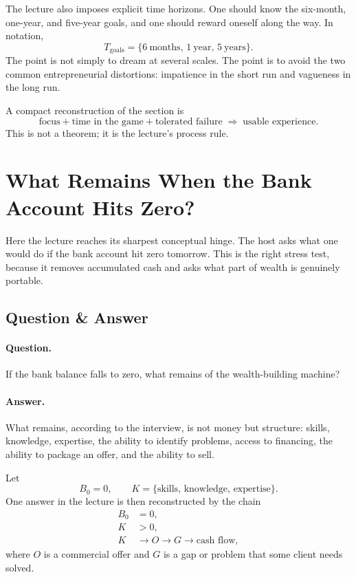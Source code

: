 The lecture also imposes explicit time horizons. One should know the six-month, one-year, and five-year goals, and one should reward oneself along the way. In notation,
\begin{equation}
T_{\mathrm{goals}}=\{6\ \mathrm{months},\,1\ \mathrm{year},\,5\ \mathrm{years}\}.
\end{equation}
The point is not simply to dream at several scales. The point is to avoid the two common entrepreneurial distortions: impatience in the short run and vagueness in the long run.

A compact reconstruction of the section is
\begin{equation}
\text{focus} + \text{time in the game} + \text{tolerated failure}
\;\Longrightarrow\; \text{usable experience}.
\end{equation}
This is not a theorem; it is the lecture's process rule.

\section{What Remains When the Bank Account Hits Zero?}

Here the lecture reaches its sharpest conceptual hinge. The host asks what one would do if the bank account hit zero tomorrow. This is the right stress test, because it removes accumulated cash and asks what part of wealth is genuinely portable.

\subsection{Question \& Answer}

\paragraph{Question.}
If the bank balance falls to zero, what remains of the wealth-building machine?

\paragraph{Answer.}
What remains, according to the interview, is not money but structure: skills, knowledge, expertise, the ability to identify problems, access to financing, the ability to package an offer, and the ability to sell.

Let
\begin{equation}
B_0 = 0,
\qquad
K=\{\text{skills},\,\text{knowledge},\,\text{expertise}\}.
\end{equation}
One answer in the lecture is then reconstructed by the chain
\begin{align}
B_0 &= 0, \\
K &> 0, \\
K &\longrightarrow O \longrightarrow G \longrightarrow \text{cash flow},
\end{align}
where \(O\) is a commercial offer and \(G\) is a gap or problem that some client needs solved.

